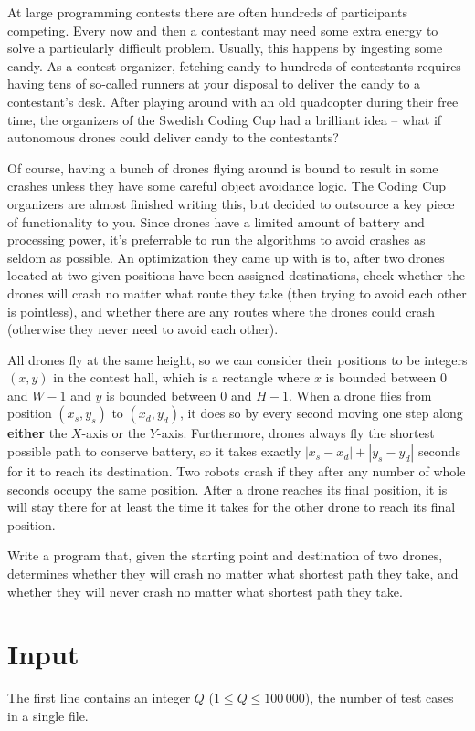 At large programming contests there are often hundreds of participants competing.
Every now and then a contestant may need some extra energy to solve a particularly difficult problem.
Usually, this happens by ingesting some candy.
As a contest organizer, fetching candy to hundreds of contestants requires having tens of so-called runners at your disposal to deliver the candy to a contestant's desk.
After playing around with an old quadcopter during their free time, the organizers of the Swedish Coding Cup had a brilliant idea -- what if autonomous drones could deliver candy to the contestants?

Of course, having a bunch of drones flying around is bound to result in some crashes unless they have some careful object avoidance logic.
The Coding Cup organizers are almost finished writing this, but decided to outsource a key piece of functionality to you.
Since drones have a limited amount of battery and processing power, it's preferrable to run the algorithms to avoid crashes as seldom as possible.
An optimization they came up with is to, after two drones located at two given positions have been assigned destinations, check whether the drones will crash no matter what route they take (then trying to avoid each other is pointless), and whether there are any routes where the drones could crash (otherwise they never need to avoid each other).

All drones fly at the same height, so we can consider their positions to be integers $(x, y)$ in the contest hall, which is a rectangle where $x$ is bounded between $0$ and $W - 1$ and $y$ is bounded between $0$ and $H - 1$.
When a drone flies from position $(x_s, y_s)$ to $(x_d, y_d)$, it does so by every second moving one step along \textbf{either} the $X$-axis or the $Y$-axis.
Furthermore, drones always fly the shortest possible path to conserve battery, so it takes exactly $|x_s - x_d| + |y_s - y_d|$ seconds for it to reach its destination.
Two robots crash if they after any number of whole seconds occupy the same position.
After a drone reaches its final position, it is will stay there for at least the time it takes for the other drone to reach its final position.

Write a program that, given the starting point and destination of two drones, determines whether they will crash no matter what shortest path they take, and whether they will never crash no matter what shortest path they take.

\section*{Input}
The first line contains an integer $Q$ ($1 \le Q \le 100\,000$), the number of test cases in a single file.

